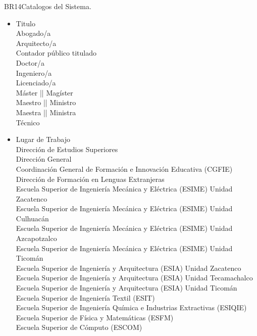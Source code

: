 \begin{BussinesRule}{BR14}{Catalogos del Sistema.}
\begin{itemize}
            Docente\\
            Director de Educación Superiores
        \item Titulo\\
            Abogado/a\\
            Arquitecto/a\\
            Contador público titulado\\
            Doctor/a\\
            Ingeniero/a\\
            Licenciado/a\\
            Máster || Magíster\\
            Maestro || Ministro\\
            Maestra || Ministra\\
            Técnico
        \item Lugar de Trabajo\\
            Dirección de Estudios Superiores\\
            Dirección General\\
            Coordinación General de Formación e Innovación Educativa (CGFIE)\\
            Dirección de Formación en Lenguas Extranjeras\\
            Escuela Superior de Ingeniería Mecánica y Eléctrica (ESIME) Unidad Zacatenco \\
            Escuela Superior de Ingeniería Mecánica y Eléctrica (ESIME) Unidad Culhuacán \\
            Escuela Superior de Ingeniería Mecánica y Eléctrica (ESIME) Unidad Azcapotzalco \\
            Escuela Superior de Ingeniería Mecánica y Eléctrica (ESIME) Unidad Ticomán \\
            Escuela Superior de Ingeniería y Arquitectura (ESIA) Unidad Zacatenco \\
            Escuela Superior de Ingeniería y Arquitectura (ESIA) Unidad Tecamachalco \\
            Escuela Superior de Ingeniería y Arquitectura (ESIA) Unidad Ticomán \\
            Escuela Superior de Ingeniería Textil (ESIT) \\
            Escuela Superior de Ingeniería Química e Industrias Extractivas (ESIQIE) \\
            Escuela Superior de Física y Matemáticas (ESFM) \\
            Escuela Superior de Cómputo (ESCOM) \\

\end{itemize}
\end{BussinesRule}
